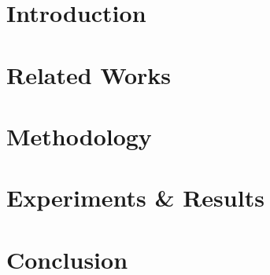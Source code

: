 \documentclass[conference]{IEEEtran}
\begin{document}
\section{Introduction}


\section{Related Works}


\section{Methodology}


\section{Experiments \& Results}


\section{Conclusion}


\printbibliography
\end{document}
